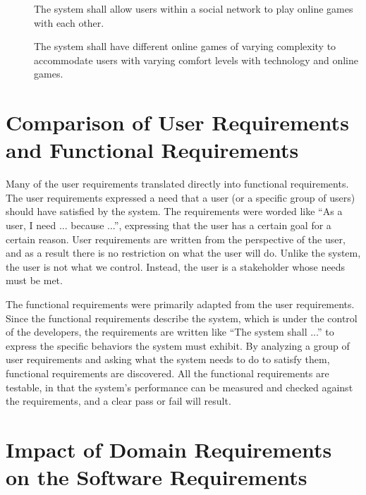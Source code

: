 \begin{description}
    \item[\textbf{\showfuncgamecounter}]
        The system shall allow users within a social network to play online
            games with each other.
    \item[\textbf{\showfuncgamecounter}]
        The system shall have different online games of varying complexity to
            accommodate users with varying comfort levels with technology and
            online games.
\end{description}

\pagebreak

\section*{Comparison of User Requirements and Functional Requirements}

Many of the user requirements translated directly into functional requirements.
The user requirements expressed a need that a user (or a specific group of
    users) should have satisfied by the system.
The requirements were worded like ``As a user, I need ... because ...'',
    expressing that the user has a certain goal for a certain reason.
User requirements are written from the perspective of the user, and as a result
    there is no restriction on what the user will do.
Unlike the system, the user is not what we control.
Instead, the user is a stakeholder whose needs must be met.

The functional requirements were primarily adapted from the user requirements.
Since the functional requirements describe the system, which is under the
    control of the developers, the requirements are written like ``The system
    shall ...'' to express the specific behaviors the system must exhibit.
By analyzing a group of user requirements and asking what the system needs to do
    to satisfy them, functional requirements are discovered.
All the functional requirements are testable, in that the system's performance
    can be measured and checked against the requirements, and a clear pass or
    fail will result.

\pagebreak

\section*{Impact of Domain Requirements on the Software Requirements}


